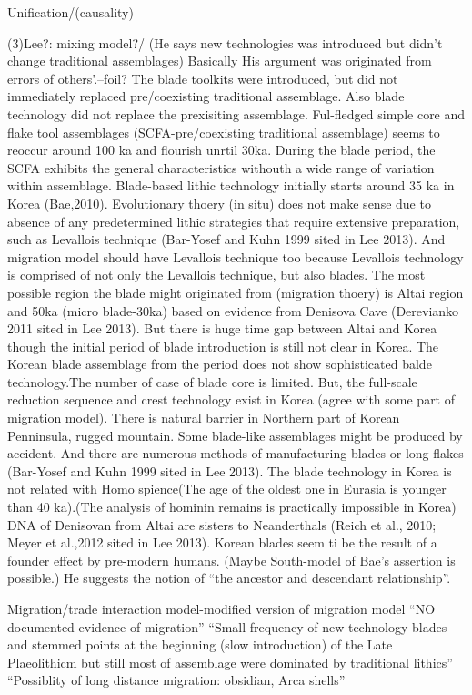 \documentclass[american,man]{apa6}
\begin{document}
Unification/(causality)

(3)Lee?: mixing model?/ (He says new technologies was introduced but
didn't change traditional assemblages) Basically His argument was
originated from errors of others'.--foil? The blade toolkits were
introduced, but did not immediately replaced pre/coexisting traditional
assemblage. Also blade technology did not replace the prexisiting
assemblage. Ful-fledged simple core and flake tool assemblages
(SCFA-pre/coexisting traditional assemblage) seems to reoccur around 100
ka and flourish unrtil 30ka. During the blade period, the SCFA exhibits
the general characteristics withouth a wide range of variation within
assemblage. Blade-based lithic technology initially starts around 35 ka
in Korea (Bae,2010). Evolutionary thoery (in situ) does not make sense
due to absence of any predetermined lithic strategies that require
extensive preparation, such as Levallois technique (Bar-Yosef and Kuhn
1999 sited in Lee 2013). And migration model should have Levallois
technique too because Levallois technology is comprised of not only the
Levallois technique, but also blades. The most possible region the blade
might originated from (migration thoery) is Altai region and 50ka (micro
blade-30ka) based on evidence from Denisova Cave (Derevianko 2011 sited
in Lee 2013). But there is huge time gap between Altai and Korea though
the initial period of blade introduction is still not clear in Korea.
The Korean blade assemblage from the period does not show sophisticated
balde technology.The number of case of blade core is limited. But, the
full-scale reduction sequence and crest technology exist in Korea (agree
with some part of migration model). There is natural barrier in Northern
part of Korean Penninsula, rugged mountain. Some blade-like assemblages
might be produced by accident. And there are numerous methods of
manufacturing blades or long flakes (Bar-Yosef and Kuhn 1999 sited in
Lee 2013). The blade technology in Korea is not related with Homo
spience(The age of the oldest one in Eurasia is younger than 40 ka).(The
analysis of hominin remains is practically impossible in Korea) DNA of
Denisovan from Altai are sisters to Neanderthals (Reich et al., 2010;
Meyer et al.,2012 sited in Lee 2013). Korean blades seem ti be the
result of a founder effect by pre-modern humans. (Maybe South-model of
Bae's assertion is possible.) He suggests the notion of \enquote{the
ancestor and descendant relationship}.

Migration/trade interaction model-modified version of migration model
\enquote{NO documented evidence of migration} \enquote{Small frequency
of new technology-blades and stemmed points at the beginning (slow
introduction) of the Late Plaeolithicm but still most of assemblage were
dominated by traditional lithics} \enquote{Possiblity of long distance
migration: obsidian, Arca shells}
\end{document}
